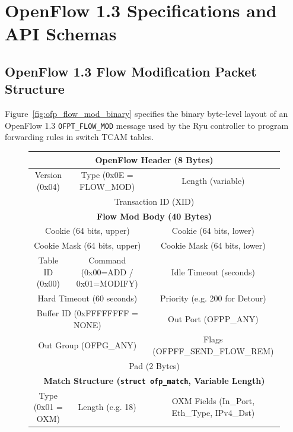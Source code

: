 \chapter{OpenFlow 1.3 Specifications and API Schemas}
\label{app:api_flowmod}

\section{OpenFlow 1.3 Flow Modification Packet Structure}
Figure~\ref{fig:ofp_flow_mod_binary} specifies the binary byte-level layout of an OpenFlow 1.3 \texttt{OFPT\_FLOW\_MOD} message used by the Ryu controller to program forwarding rules in switch TCAM tables.

\begin{figure}[H]
  \centering
  \small\ttfamily
  \begin{tabular}{|c|c|c|c|}
    \hline
    \multicolumn{4}{|c|}{\textbf{OpenFlow Header (8 Bytes)}}\\
    \hline
    Version (0x04) & Type (0x0E = FLOW\_MOD) & \multicolumn{2}{c|}{Length (variable)}\\
    \hline
    \multicolumn{4}{|c|}{Transaction ID (XID)}\\
    \hline
    \multicolumn{4}{|c|}{\textbf{Flow Mod Body (40 Bytes)}}\\
    \hline
    \multicolumn{2}{|c|}{Cookie (64 bits, upper)} & \multicolumn{2}{c|}{Cookie (64 bits, lower)}\\
    \hline
    \multicolumn{2}{|c|}{Cookie Mask (64 bits, upper)} & \multicolumn{2}{c|}{Cookie Mask (64 bits, lower)}\\
    \hline
    Table ID (0x00) & Command (0x00=ADD / 0x01=MODIFY) & \multicolumn{2}{c|}{Idle Timeout (seconds)}\\
    \hline
    \multicolumn{2}{|c|}{Hard Timeout (60 seconds)} & \multicolumn{2}{c|}{Priority (e.g. 200 for Detour)}\\
    \hline
    \multicolumn{2}{|c|}{Buffer ID (0xFFFFFFFF = NONE)} & \multicolumn{2}{c|}{Out Port (OFPP\_ANY)}\\
    \hline
    \multicolumn{2}{|c|}{Out Group (OFPG\_ANY)} & \multicolumn{2}{c|}{Flags (OFPFF\_SEND\_FLOW\_REM)}\\
    \hline
    \multicolumn{4}{|c|}{Pad (2 Bytes)}\\
    \hline
    \multicolumn{4}{|c|}{\textbf{Match Structure (\texttt{struct ofp\_match}, Variable Length)}}\\
    \hline
    Type (0x01 = OXM) & Length (e.g. 18) & \multicolumn{2}{c|}{OXM Fields (In\_Port, Eth\_Type, IPv4\_Dst)}\\

\end{tabular}
\end{figure}
